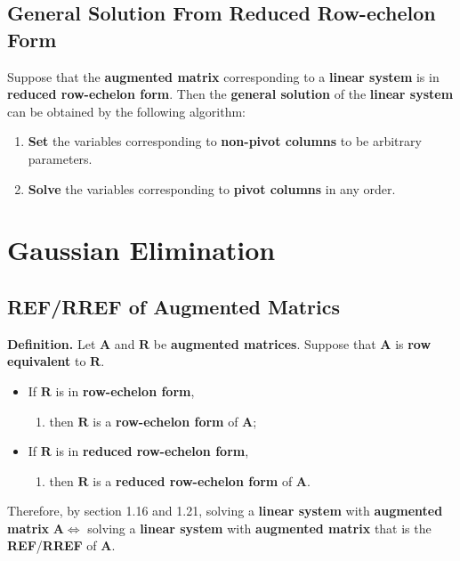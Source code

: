 \documentclass[../ma2001_notes.tex]{subfiles}
\begin{document}
\subsection{General Solution From Reduced Row-echelon Form}
Suppose that the \textbf{augmented matrix} corresponding to a \textbf{linear system} is in \textbf{reduced row-echelon form}. Then the \textbf{general solution} of the \textbf{linear system} can be obtained by the following algorithm:
\begin{enumerate}
	\item\textbf{Set} the variables corresponding to \textbf{non-pivot columns} to be arbitrary parameters.
	\item\textbf{Solve} the variables corresponding to \textbf{pivot columns} in any order.
\end{enumerate}

\section{Gaussian Elimination}
\subsection{REF/RREF of Augmented Matrics}
\textbf{Definition.} Let \(\bm{A}\) and \(\bm{R}\) be \textbf{augmented matrices}. Suppose that \(\bm{A}\) is \textbf{row equivalent} to \(\bm{R}\).
\begin{itemize}
	\item If \(\bm{R}\) is in \textbf{row-echelon form},
	\begin{enumerate}
		\item then \(\bm{R}\) is a \textbf{row-echelon form} of \(\bm{A}\);
	\end{enumerate}
	\item If \(\bm{R}\) is in \textbf{reduced row-echelon form},
	\begin{enumerate}
		\item then \(\bm{R}\) is a \textbf{reduced row-echelon form} of \(\bm{A}\).
	\end{enumerate}
\end{itemize}
Therefore, by section 1.16 and 1.21, solving a \textbf{linear system} with \textbf{augmented matrix} \(\bm{A}\iff\) solving a \textbf{linear system} with \textbf{augmented matrix} that is the \textbf{REF}/\textbf{RREF} of \(\bm{A}\).
\end{document}
